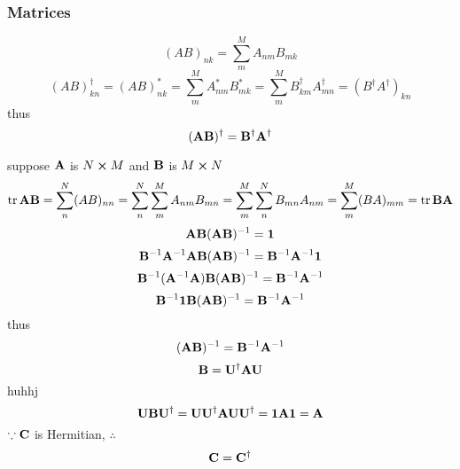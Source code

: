 \documentclass[a4paper]{article}
\begin{document}
\subsubsection{Matrices}
\begin{equation}\label{key}
(AB)_{nk} = \sum_m^M A_{nm}B_{mk}
\end{equation}
\begin{equation}\label{key}
(AB)^\dagger_{kn} = (AB)_{nk}^* = \sum_m^M A_{nm}^*B_{mk}^* = \sum_m^M B^\dagger_{km} A^\dagger_{mn} = (B^\dagger A^\dagger)_{kn}
\end{equation}
thus
\begin{equation}\label{key}
(\vb{A}\vb{B})^\dagger = \vb{B}^\dagger \vb{A}^\dagger
\end{equation}

suppose $ \vb{A} $ is $ N\cross M $ and $ \vb{B} $ is $ M\cross N $
\begin{equation}\label{key}
\tr \vb{A}\vb{B} = \sum_n^N (AB)_{nn} = \sum_n^N \sum_m^M A_{nm}B_{mn} = \sum_m^M\sum_n^N  B_{mn}A_{nm} = \sum_m^M (BA)_{mm} = \tr \vb{B}\vb{A}
\end{equation}
\begin{equation}\label{key}
\vb{AB}(\vb{AB})^{-1} = {\large \bm{1}}
\end{equation}
\begin{equation}\label{key}
\vb{B}^{-1}\vb{A}^{-1}\vb{A}\vb{B}(\vb{AB})^{-1} = \vb{B}^{-1}\vb{A}^{-1}{\large \bm{1}}
\end{equation}
\begin{equation}\label{key}
\vb{B}^{-1}(\vb{A}^{-1}\vb{A})\vb{B}(\vb{AB})^{-1} = \vb{B}^{-1}\vb{A}^{-1}
\end{equation}
\begin{equation}\label{key}
\vb{B}^{-1} {\large \bm{1}} \vb{B}(\vb{AB})^{-1} = \vb{B}^{-1}\vb{A}^{-1}
\end{equation}
thus
\begin{equation}\label{key}
(\vb{AB})^{-1} = \vb{B}^{-1}\vb{A}^{-1}
\end{equation}
\begin{equation}\label{key}
\vb{B} = \vb{U}^\dagger \vb{A} \vb{U}
\end{equation}huhhj
\begin{equation}\label{key}
\vb{U} \vb{B} \vb{U}^\dagger = \vb{U} \vb{U}^\dagger \vb{A} \vb{U} \vb{U}^\dagger = {\large \bm{1}} \vb{A} {\large \bm{1}} = \vb{A}
\end{equation}
$ \because \vb{C}$ is Hermitian, $ \therefore $
\begin{equation}\label{key}
\vb{C} = \vb{C}^\dagger
\end{equation}
\end{document}

